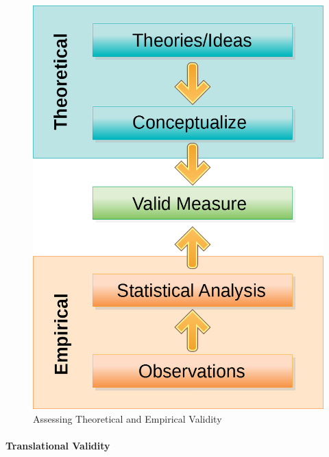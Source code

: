 \begin{figure}[H]
	\centering
	\includegraphics[width=\maxwidth{.95\linewidth}]{gfx/05-AssessValidity}
	\caption{Assessing Theoretical and Empirical Validity}
	\label{05:fig04}
\end{figure}

\paragraph{Translational Validity}

